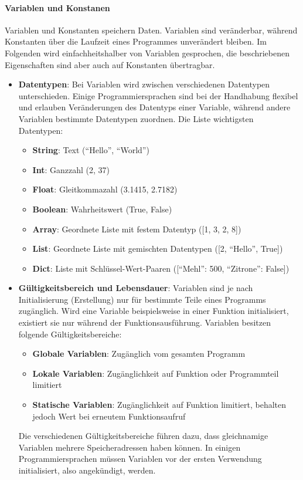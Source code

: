 \documentclass[11pt, a4paper]{article}
\begin{document}
\paragraph{Variablen und Konstanen}
Variablen und Konstanten speichern Daten. Variablen sind veränderbar, während Konstanten über die Laufzeit eines Programmes unverändert bleiben. Im Folgenden wird einfachheitshalber von Variablen gesprochen, die beschriebenen Eigenschaften sind aber auch auf Konstanten übertragbar.

\begin{itemize}
	\item \textbf{Datentypen}: Bei Variablen wird zwischen verschiedenen Datentypen unterschieden. Einige Programmiersprachen sind bei der Handhabung flexibel und erlauben Veränderungen des Datentyps einer Variable, während andere Variablen bestimmte Datentypen zuordnen. Die Liste wichtigsten Datentypen:
	\begin{itemize}
		\item \textbf{String}: Text (``Hello'', ``World'')
		\item \textbf{Int}: Ganzzahl (2, 37)
		\item \textbf{Float}: Gleitkommazahl (3.1415, 2.7182)
		\item \textbf{Boolean}: Wahrheitswert (True, False)
		\item \textbf{Array}: Geordnete Liste mit festem Datentyp ([1, 3, 2, 8])
		\item \textbf{List}: Geordnete Liste mit gemischten Datentypen ([2, ``Hello'', True])
		\item \textbf{Dict}: Liste mit Schlüssel-Wert-Paaren ([``Mehl'': 500, ``Zitrone'': False])
	\end{itemize}
	\item \textbf{Gültigkeitsbereich und Lebensdauer}: Variablen sind je nach Initialisierung (Erstellung) nur für bestimmte Teile eines Programms zugänglich. Wird eine Variable beispielsweise in einer Funktion initialisiert, existiert sie nur während der Funktionsausführung. Variablen besitzen folgende Gültigkeitsbereiche:
	\begin{itemize}
		\item \textbf{Globale Variablen}: Zugänglich vom gesamten Programm
		\item \textbf{Lokale Variablen}: Zugänglichkeit auf Funktion oder Programmteil limitiert
		\item \textbf{Statische Variablen}: Zugänglichkeit auf Funktion limitiert, behalten jedoch Wert bei erneutem Funktionsaufruf
	\end{itemize}
	Die verschiedenen Gültigkeitsbereiche führen dazu, dass gleichnamige Variablen mehrere Speicheradressen haben können. In einigen Programmiersprachen müssen Variablen vor der ersten Verwendung initialisiert, also angekündigt, werden. 
\end{itemize}
\end{document}
